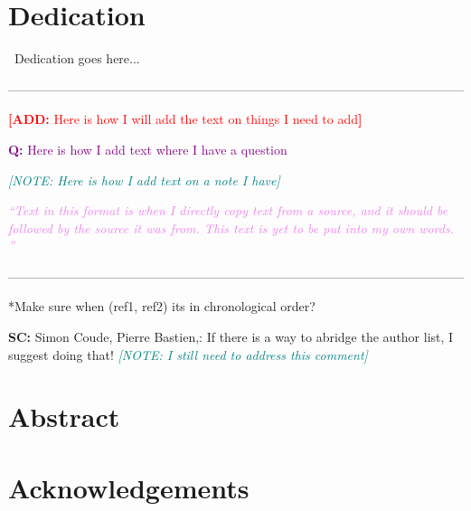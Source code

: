 \documentclass[12pt]{report}
\newcommand{\add}[1]{\textcolor{red}{\textbf{[ADD:} #1\textbf{]}}}
\newcommand{\question}[1]{\textcolor{purple}{\textbf{Q:} #1\textbf{}}}
\newcommand{\SC}[1]{\textcolor{sc}{\textbf{SC:} #1\textbf{}}}
\newcommand{\note}[1]{\textcolor{teal}{\textit{[NOTE: #1]}}}
\newcommand{\quoted}[1]{\textcolor{violet}{\textit{``#1''}}}
\begin{document}
{}






\chapter*{Dedication}\
Dedication goes here... 

------------------------------------------------------------------------------------------------------------

\add{Here is how I will add the text on things I need to add}

\question{Here is how I add text where I have a question}


\note{Here is how I add text on a note I have}

\quoted{Text in this format is when I directly copy text from a source, and it should be followed by the source it was from. This text is yet to be put into my own words. }

------------------------------------------------------------------------------------------------------------


*Make sure when (ref1, ref2) its in chronological order?

\SC{Simon Coude, Pierre Bastien,: If there is a way to abridge the author list, I suggest doing that!}
\note{I still need to address this comment}




\chapter*{Abstract}



\chapter*{Acknowledgements}
\end{document}
